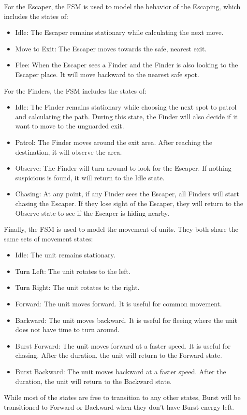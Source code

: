 \documentclass[a4paper,12pt]{article}
\begin{document}
For the Escaper, the FSM is used to model the behavior of the Escaping, which includes the states of:
\begin{itemize}
    \item Idle: The Escaper remains stationary while calculating the next move.
    \item Move to Exit: The Escaper moves towards the safe, nearest exit.
    \item Flee: When the Escaper sees a Finder and the Finder is also looking to the Escaper place.
        It will move backward to the nearest safe spot.
\end{itemize}

For the Finders, the FSM includes the states of:
\begin{itemize}
    \item Idle: The Finder remains stationary while choosing the next spot to patrol and calculating the path.
        During this state, the Finder will also decide if it want to move to the unguarded exit.
    \item Patrol: The Finder moves around the exit area.
        After reaching the destination, it will observe the area.
    \item Observe: The Finder will turn around to look for the Escaper.
        If nothing suspicious is found, it will return to the Idle state.
    \item Chasing: At any point, if any Finder sees the Escaper, all Finders will start chasing the Escaper.
        If they lose sight of the Escaper, they will return to the Observe state to see if the Escaper is hiding nearby.
\end{itemize}

Finally, the FSM is used to model the movement of units.
They both share the same sets of movement states:
\begin{itemize}
    \item Idle: The unit remains stationary.
    \item Turn Left: The unit rotates to the left.
    \item Turn Right: The unit rotates to the right.
    \item Forward: The unit moves forward. It is useful for common movement.
    \item Backward: The unit moves backward. It is useful for fleeing where the unit does not have time to turn around.
    \item Burst Forward: The unit moves forward at a faster speed. It is useful for chasing. After the duration, the unit will return to the Forward state.
    \item Burst Backward: The unit moves backward at a faster speed. After the duration, the unit will return to the Backward state.
\end{itemize}
While most of the states are free to transition to any other states, Burst will be transitioned to Forward or Backward when they don't have Burst energy left.
\end{document}
